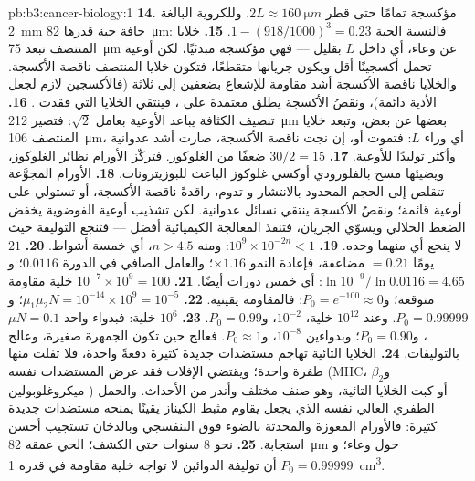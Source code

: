 \begin{solution}{pb:b3:cancer-biology:1}
\textbf{14.} مؤكسجة تمامًا حتى قطر $2L \approx
\qty{160}{\micro m}$. وللكروية البالغة \qty{2}{mm} حافة حية قدرها
\qty{82}{\micro m}: فالنسبة الحية $1 - (918/1000)^{3} = 0.23$.
\textbf{15.} خلايا المنتصف تبعد \qty{75}{\micro m} عن وعاء، أي داخل
$L$ بقليل --- فهي مؤكسجة مبدئيًا، لكن أوعية  تحمل أكسجينًا أقل
ويكون جريانها متقطعًا، فتكون خلايا المنتصف ناقصة الأكسجة.
والخلايا ناقصة الأكسجة أشد مقاومة للإشعاع بضعفين إلى ثلاثة
(فالأكسجين لازم لجعل الأذية دائمة)، ونقصُ الأكسجة يطلق
 معتمدة على ، فينتقي الخلايا التي فقدت .
\textbf{16.} تنصيف الكثافة يباعد الأوعية بعامل $\sqrt{2}$:
فتصير \qty{212}{\micro m} بعضها عن بعض، وتبعد خلايا المنتصف \qty{106}{\micro m}، أي وراء
$L$: فتموت أو، إن نجت ناقصة الأكسجة، صارت أشد عدوانية وأكثر
توليدًا للأوعية.
\textbf{17.} $30/2 = 15$ ضعفًا من الغلوكوز. فتركّز الأورام
نظائر الغلوكوز، ويضيئها مسح
بالفلورودي أوكسي غلوكوز الباعث للبوزيترونات.
\textbf{18.} الأورام المجوَّعة تتقلص إلى الحجم المحدود بالانتشار و
تدوم، راقدةً ناقصة الأكسجة، أو تستولي على أوعية قائمة؛ ونقصُ الأكسجة
ينتقي نسائل عدوانية. لكن تشذيب أوعية  الفوضوية
يخفض الضغط الخلالي ويسوّي الجريان، فتنفذ المعالجة الكيميائية
أفضل --- فتنجع التوليفة حيث لا ينجع أي منهما
وحده.
\textbf{19.} $10^{9}\times 10^{-2n} < 1$: ومنه $n > 4.5$، أي خمسة أشواط.
\textbf{20.} $21$ يومًا $= 0.21$ مضاعفة، فإعادة النمو $\times 1.16$؛ والعامل
الصافي في الدورة $0.0116$؛ و$\ln 10^{-9}/\ln 0.0116 = 4.65$: أي خمس
دورات أيضًا.
\textbf{21.} $10^{-7}\times 10^{9} = 100$ خلية مقاومة متوقعة؛
و$P_{0} = e^{-100} \approx 0$: فالمقاومة يقينية.
\textbf{22.} $\mu_{1}\mu_{2}N = 10^{-14}\times 10^{9} = 10^{-5}$؛
و$P_{0} = 0.99999$. وعند $10^{12}$ خلية، $10^{-2}$، و$P_{0} = 0.99$.
\textbf{23.} $10^{6}$ خلية: فبدواء واحد $\mu N = 0.1$، و$P_{0} = 0.90$؛ وبدواءين
$10^{-8}$، و$P_{0} \approx 1$. فعالج حين تكون الجمهرة صغيرة،
وعالج بالتوليفات.
\textbf{24.} الخلايا التائية تهاجم مستضدات جديدة كثيرة دفعةً واحدة، فلا تفلت منها
طفرة واحدة؛ ويقتضي الإفلات فقد عرض المستضدات
نفسه (MHC، و$\beta_{2}$-ميكروغلوبولين) أو كبت الخلايا التائية، وهو
صنف مختلف وأندر من الأحداث. والحمل الطفري العالي نفسه الذي
يجعل  يقاوم مثبط الكيناز يقينًا يمنحه مستضدات جديدة كثيرة:
فالأورام المعوزة  والمحدثة بالضوء فوق البنفسجي وبالدخان
تستجيب أحسن استجابة.
\textbf{25.} نحو $8$ سنوات حتى الكشف؛  الحي عمقه \qty{82}{\micro m}
حول وعاء؛ و$P_{0} = 0.99999$ أن توليفة الدوائين
لا تواجه خلية مقاومة في  قدره \qty{1}{cm^3}.
\end{solution}
